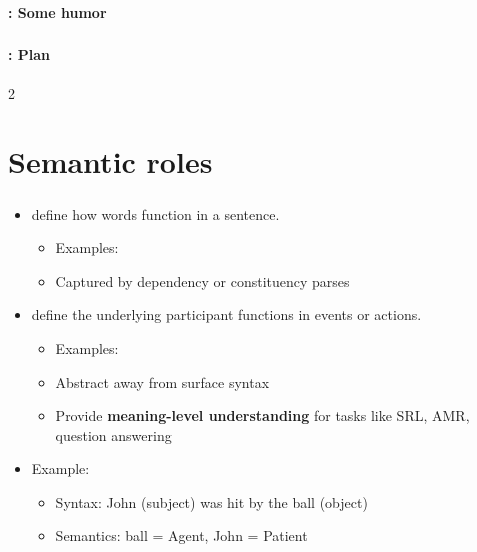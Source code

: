 \documentclass[xcolor=table]{beamer}
\begin{document}
\begin{frame}
	\frametitle{\inserttitle}
	\framesubtitle{\insertshortsubtitle: Some humor}
	
	\begin{center}
	\end{center}
	
\end{frame}

\begin{frame}
	\frametitle{\inserttitle}
	\framesubtitle{\insertshortsubtitle: Plan}

	\begin{multicols}{2}
	\tableofcontents
	\end{multicols}

\end{frame}

\section{Semantic roles}

\begin{frame}
	\frametitle{\insertshortsubtitle}
	\framesubtitle{\insertsection}
	
	\begin{itemize}
		\item {} define how words function in a sentence.
		\begin{itemize}
			\item Examples: 
			\item Captured by dependency or constituency parses
		\end{itemize}
		
		\item {} define the underlying participant functions in events or actions.
		\begin{itemize}
			\item Examples: 
			\item Abstract away from surface syntax
			\item Provide \textbf{meaning-level understanding} for tasks like SRL, AMR, question answering
		\end{itemize}
		
		\item Example:
		\begin{itemize}
			\item Syntax: John (subject) was hit by the ball (object)
			\item Semantics: ball = Agent, John = Patient
		\end{itemize}
	\end{itemize}
\end{frame}
\end{document}
